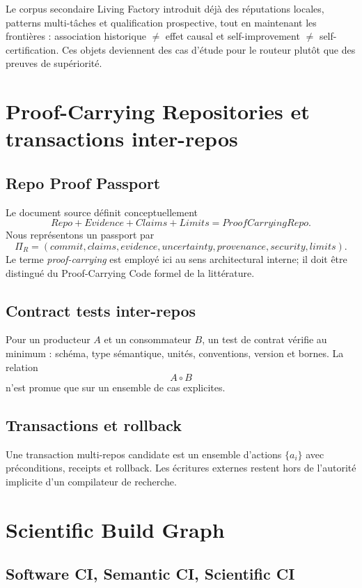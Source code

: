 Le corpus secondaire Living Factory introduit déjà des réputations locales, patterns multi-tâches et qualification prospective, tout en maintenant les frontières : association historique $\neq$ effet causal et self-improvement $\neq$ self-certification. Ces objets deviennent des cas d'étude pour le routeur plutôt que des preuves de supériorité.

\chapter{Proof-Carrying Repositories et transactions inter-repos}

\section{Repo Proof Passport}

Le document source définit conceptuellement
\[
Repo+Evidence+Claims+Limits=ProofCarryingRepo.
\]
Nous représentons un passport par
\[
\Pi_R=(commit,claims,evidence,uncertainty,provenance,security,limits).
\]
Le terme \emph{proof-carrying} est employé ici au sens architectural interne; il doit être distingué du Proof-Carrying Code formel de la littérature.

\section{Contract tests inter-repos}

Pour un producteur $A$ et un consommateur $B$, un test de contrat vérifie au minimum : schéma, type sémantique, unités, conventions, version et bornes. La relation
\[
A\circ B
\]
n'est promue que sur un ensemble de cas explicites.

\section{Transactions et rollback}

Une transaction multi-repos candidate est un ensemble d'actions $\{a_i\}$ avec préconditions, receipts et rollback. Les écritures externes restent hors de l'autorité implicite d'un compilateur de recherche.

\chapter{Scientific Build Graph}

\section{Software CI, Semantic CI, Scientific CI}

